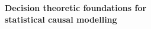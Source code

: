 

\frontmatter %

\pagestyle{plain} %


\begin{titlepage}
\begin{center}

\vspace*{.02\textheight}



{\bfseries
\LARGE{Decision theoretic foundations for\\ statistical causal modelling}\\
\bigskip
\large{}
}

\vspace{1cm} %

 
\begin{minipage}[t]{0.3\textwidth}
\begin{center}
 \large
 \authorname %
\end{center}
\end{minipage}

 

\end{center}
\end{titlepage}

